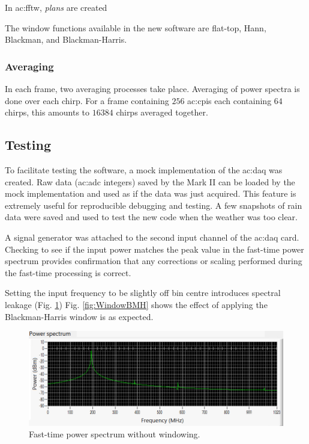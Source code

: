 \documentclass{article}
\begin{document}
In \acrshort{ac:fftw}, \textit{plans} are created 

The window functions available in the new software are flat-top, Hann, Blackman, and Blackman-Harris.

\subsubsection{Averaging}
In each frame, two averaging processes take place. Averaging of power spectra is done over each chirp. For a frame containing \(256\) \acrshort{ac:cpi}s each containing \(64\) chirps, this amounts to \(16384\) chirps averaged together. 

\subsection{Testing}
To facilitate testing the software, a mock implementation of the \acrshort{ac:daq} was created. Raw data (\acrshort{ac:adc} integers) saved by the Mark II can be loaded by the mock implementation and used as if the data was just acquired. This feature is extremely useful for reproducible debugging and testing. A few snapshots of rain data were saved and used to test the new code when the weather was too clear.

A signal generator was attached to the second input channel of the \acrshort{ac:daq} card. Checking to see if the input power matches the peak value in the fast-time power spectrum provides confirmation that any corrections or scaling performed during the fast-time processing is correct.

Setting the input frequency to be slightly off bin centre introduces spectral leakage (Fig. \ref{fig:WindowNone}) Fig. \ref{fig:WindowBMH} shows the effect of applying the Blackman-Harris window is as expected.

\begin{figure}
	\centering
	\includegraphics[width=\textwidth]{window-none}
	\caption{Fast-time power spectrum without windowing.}
	\label{fig:WindowNone}
\end{figure}
\end{document}
